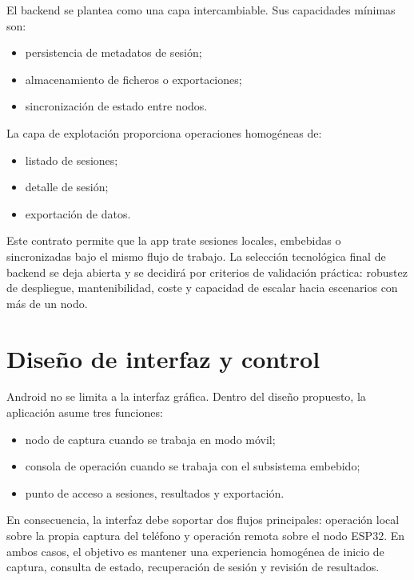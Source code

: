 El backend se plantea como una capa intercambiable. Sus capacidades mínimas son:

\begin{itemize}
  \item persistencia de metadatos de sesión;
  \item almacenamiento de ficheros o exportaciones;
  \item sincronización de estado entre nodos.
\end{itemize}

La capa de explotación proporciona operaciones homogéneas de:

\begin{itemize}
  \item listado de sesiones;
  \item detalle de sesión;
  \item exportación de datos.
\end{itemize}

Este contrato permite que la app trate sesiones locales, embebidas o sincronizadas bajo el mismo flujo de trabajo. La selección tecnológica final de backend se deja abierta y se decidirá por criterios de validación práctica: robustez de despliegue, mantenibilidad, coste y capacidad de escalar hacia escenarios con más de un nodo.

\label{fig:placeholder-despliegue-persistencia}

\section{Diseño de interfaz y control}

Android no se limita a la interfaz gráfica. Dentro del diseño propuesto, la aplicación asume tres funciones:

\begin{itemize}
  \item nodo de captura cuando se trabaja en modo móvil;
  \item consola de operación cuando se trabaja con el subsistema embebido;
  \item punto de acceso a sesiones, resultados y exportación.
\end{itemize}

En consecuencia, la interfaz debe soportar dos flujos principales: operación local sobre la propia captura del teléfono y operación remota sobre el nodo ESP32. En ambos casos, el objetivo es mantener una experiencia homogénea de inicio de captura, consulta de estado, recuperación de sesión y revisión de resultados.

